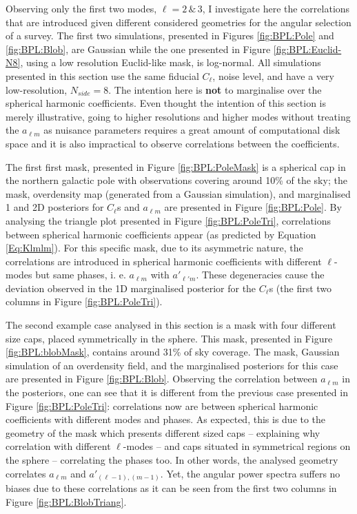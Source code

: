 \qquad Observing only the first two modes, $\ell = 2 \, \& \, 3$, I investigate here the correlations that are introduced given different considered geometries for the angular selection of a survey. The first two simulations, presented in Figures \ref{fig:BPL:Pole} and \ref{fig:BPL:Blob}, are Gaussian while the one presented in Figure \ref{fig:BPL:Euclid-N8}, using a low resolution Euclid-like mask, is log-normal. All simulations presented in this section use the same fiducial $C_{\ell}$, noise level, and have a very low-resolution, $N_{side}=8$. The intention here is \textbf{not} to marginalise over the spherical harmonic coefficients. Even thought the intention of this section is merely illustrative, going to higher resolutions and higher modes without treating the $a_{\ell m}$ as nuisance parameters requires a great amount of computational disk space and it is also impractical to observe correlations between the coefficients. 

\qquad The first first mask, presented in Figure \ref{fig:BPL:PoleMask} is a spherical cap in the northern galactic pole with observations covering around 10\% of the sky; the mask, overdensity map (generated from a Gaussian simulation), and marginalised 1 and 2D posteriors for $C_{\ell}$s and $a_{\ell m}$ are presented in Figure \ref{fig:BPL:Pole}. By analysing the triangle plot presented in Figure \ref{fig:BPL:PoleTri}, correlations between spherical harmonic coefficients appear (as predicted by Equation \ref{Eq:Klmlm}). For this specific mask, due to its asymmetric nature, the correlations are introduced in spherical harmonic coefficients with different $\ell$-modes but same phases, i. e. $a_{\ell m}$ with $a'_{\ell' m}$. These degeneracies cause the deviation observed in the 1D marginalised posterior for the $C_{\ell}$s (the first two columns in Figure \ref{fig:BPL:PoleTri}).

\qquad The second example case analysed in this section is a mask with four different size caps, placed symmetrically in the sphere. This mask, presented in Figure \ref{fig:BPL:blobMask}, contains around 31\% of sky coverage. The mask, Gaussian simulation of an overdensity field, and the marginalised posteriors for this case are presented in Figure \ref{fig:BPL:Blob}. Observing the correlation between $a_{\ell m}$ in the posteriors, one can see that it is different from the previous case presented in Figure \ref{fig:BPL:PoleTri}: correlations now are between spherical harmonic coefficients with different modes and phases. As expected, this is due to the geometry of the mask which presents different sized caps -- explaining why correlation with different $\ell$-modes -- and caps situated in symmetrical regions on the sphere -- correlating the phases too. In other words, the analysed geometry correlates $a_{\ell m}$ and $a'_{(\ell-1),(m-1)}$. Yet, the angular power spectra suffers no biases due to these correlations as it can be seen from the first two columns in Figure \ref{fig:BPL:BlobTriang}.

